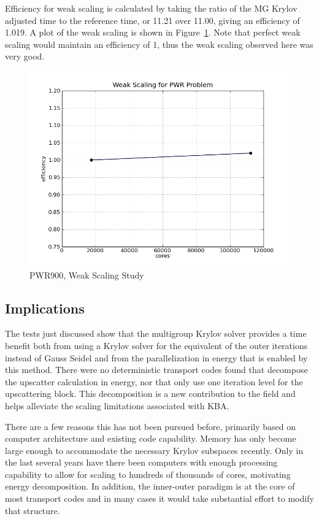 Efficiency for weak scaling is calculated by taking the ratio of the MG Krylov adjusted time to the reference time, or 11.21 over 11.00, giving an efficiency of 1.019. A plot of the weak scaling is shown in Figure~\ref{fig:PWRweakScaling}. Note that perfect weak scaling would maintain an efficiency of 1, thus the weak scaling observed here was very good. 
%
\begin{figure}[!h]
  \begin{center}
    \includegraphics [width=.8\textwidth, height=0.48\textheight ] {PWRmyWeakScaling}
  \end{center}
  \caption{PWR900, Weak Scaling Study}
  \label{fig:PWRweakScaling}
\end{figure}

\subsection{Implications}
The tests just discussed show that the multigroup Krylov solver provides a time benefit both from using a Krylov solver for the equivalent of the outer iterations instead of Gauss Seidel and from the parallelization in energy that is enabled by this method. There were no deterministic transport codes found that decompose the upscatter calculation in energy, nor that only use one iteration level for the upscattering block. This decomposition is a new contribution to the field and helps alleviate the scaling limitations associated with KBA.   

There are a few reasons this has not been pursued before, primarily based on computer architecture and existing code capability. Memory has only become large enough to accommodate the necessary Krylov subspaces recently. Only in the last several years have there been computers with enough processing capability to allow for scaling to hundreds of thousands of cores, motivating energy decomposition. In addition, the inner-outer paradigm is at the core of most transport codes and in many cases it would take substantial effort to modify that structure. 

